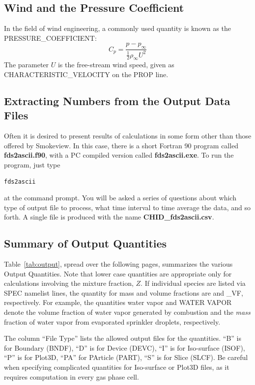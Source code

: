 \documentclass[11pt]{book}
\newcommand{\ha}{\frac{1}{2}}
\begin{document}
\subsection{Wind and the Pressure Coefficient}
\label{info:wind}

In the field of wind engineering, a commonly used quantity is known as the {\ct PRESSURE\_COEFFICIENT}:
$$ C_p = \frac{p-p_\infty}{\ha \rho_\infty U^2} $$
The parameter $U$ is the free-stream wind speed, given as {\ct CHARACTERISTIC\_VELOCITY} on the {\ct PROP} line.






\subsection{Extracting Numbers from the Output Data Files}
\label{info:fds2ascii}

Often it is desired to present results of calculations in some form other
than those offered by Smokeview. In this case, there is a short
Fortran 90 program called {\bf fds2ascii.f90}, with a PC compiled version
called {\bf fds2ascii.exe}. To run the program, just type
\begin{verbatim}
fds2ascii
\end{verbatim}
at the command prompt. You will be asked a series of questions
about which type of output file to process, what time interval to
time average the data, and so forth. A single file is produced
with the name {\bf CHID\_fds2ascii.csv}.


\clearpage
\subsection{Summary of Output Quantities}
\label{info:outputquantities}

Table~\ref{tab:output}, spread over the following pages, summarizes the various Output Quantities.
Note that lower case quantities are appropriate only for calculations involving the mixture fraction, $Z$. If
individual species are listed via {\ct SPEC} namelist lines, the quantity for mass and volume
fractions are {\ct [SPEC\_ID]} and {\ct [SPEC\_ID]\_VF}, respectively. For example, the quantities
{\ct water vapor} and {\ct WATER VAPOR} denote the volume fraction of water vapor
generated by combustion and the {\em mass} fraction of water vapor from evaporated sprinkler
droplets, respectively.

The column ``File Type'' lists the allowed output files for the quantities. ``B'' is for Boundary ({\ct BNDF}),
``D'' is for Device ({\ct DEVC}), ``I'' is for Iso-surface ({\ct ISOF}), ``P'' is for Plot3D, ``PA'' for PArticle ({\ct PART}),
``S'' is for Slice ({\ct SLCF}). Be careful
when specifying complicated quantities for Iso-surface or Plot3D files, as it requires computation in every gas phase cell.
\end{document}
